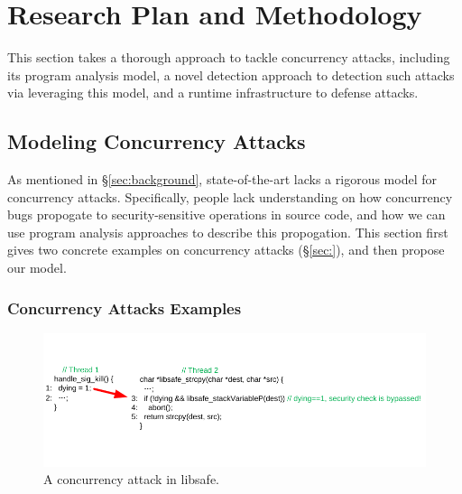 \section{Research Plan and Methodology} \label{sec:rep}

This section takes a thorough approach to tackle concurrency attacks, including 
its program analysis model, a novel detection approach to detection such 
attacks via leveraging this model, and a runtime infrastructure to defense 
attacks.

\subsection{Modeling Concurrency Attacks} \label{sec:model}

As mentioned in \S\ref{sec:background}, state-of-the-art lacks a rigorous model 
for concurrency attacks. Specifically, people lack understanding on how 
concurrency bugs propogate to security-sensitive operations in source code, and 
how we can use program analysis approaches to describe this propogation. This 
section first gives two concrete examples on concurrency attacks 
(\S\ref{sec:}), and then propose our model.

\subsubsection{Concurrency Attacks Examples} \label{sec:examples}

\begin{figure}[t]
\centering
\includegraphics[width=0.99\columnwidth]{figures/libsafe}
\vspace{-.05in}
\caption{{A concurrency attack in libsafe.}} \label{fig:libsafe}
\vspace{-.05in}
\end{figure}

